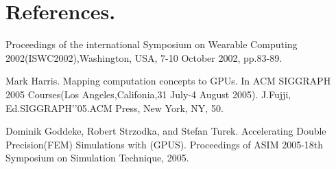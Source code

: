 \documentclass{article}
\begin{document}
\section{References.}
{Proceedings of the international Symposium on Wearable Computing 2002(ISWC2002),Washington, USA, 7-10 October 2002, pp.83-89.

Mark Harris. Mapping computation concepts to GPUs. In ACM SIGGRAPH 2005 Courses(Los Angeles,Califonia,31 July-4 August 2005). J.Fujji, Ed.SIGGRAPH’’05.ACM Press, New York, NY, 50.

Dominik Goddeke, Robert Strzodka, and Stefan Turek. Accelerating Double Precision(FEM) Simulations with (GPUS). Proceedings of ASIM 2005-18th Symposium on Simulation Technique, 2005.
}
\end{document}
